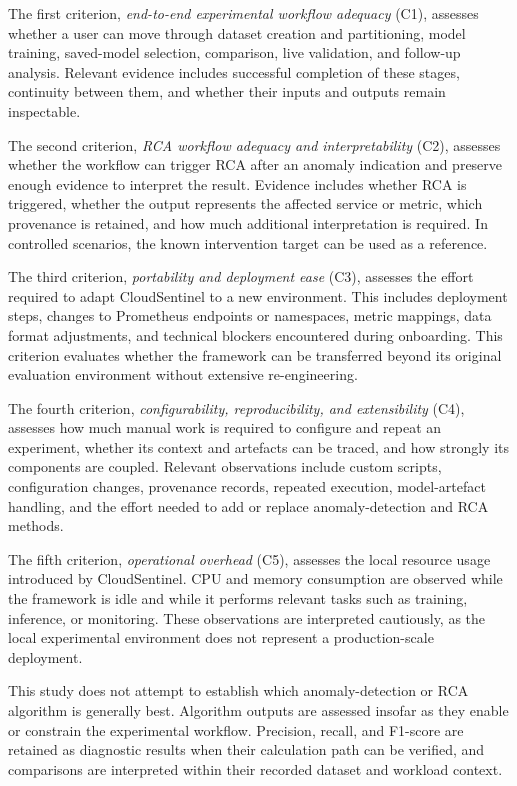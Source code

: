The first criterion, \textit{end-to-end experimental workflow adequacy} (C1), assesses whether a user can move through dataset creation and partitioning, model training, saved-model selection, comparison, live validation, and follow-up analysis. Relevant evidence includes successful completion of these stages, continuity between them, and whether their inputs and outputs remain inspectable.

The second criterion, \textit{RCA workflow adequacy and interpretability} (C2), assesses whether the workflow can trigger RCA after an anomaly indication and preserve enough evidence to interpret the result. Evidence includes whether RCA is triggered, whether the output represents the affected service or metric, which provenance is retained, and how much additional interpretation is required. In controlled scenarios, the known intervention target can be used as a reference.

The third criterion, \textit{portability and deployment ease} (C3), assesses the effort required to adapt CloudSentinel to a new environment. This includes deployment steps, changes to Prometheus endpoints or namespaces, metric mappings, data format adjustments, and technical blockers encountered during onboarding. This criterion evaluates whether the framework can be transferred beyond its original evaluation environment without extensive re-engineering.

The fourth criterion, \textit{configurability, reproducibility, and extensibility} (C4), assesses how much manual work is required to configure and repeat an experiment, whether its context and artefacts can be traced, and how strongly its components are coupled. Relevant observations include custom scripts, configuration changes, provenance records, repeated execution, model-artefact handling, and the effort needed to add or replace anomaly-detection and RCA methods.

The fifth criterion, \textit{operational overhead} (C5), assesses the local resource usage introduced by CloudSentinel. CPU and memory consumption are observed while the framework is idle and while it performs relevant tasks such as training, inference, or monitoring. These observations are interpreted cautiously, as the local experimental environment does not represent a production-scale deployment.

This study does not attempt to establish which anomaly-detection or RCA algorithm is generally best. Algorithm outputs are assessed insofar as they enable or constrain the experimental workflow. Precision, recall, and F1-score are retained as diagnostic results when their calculation path can be verified, and comparisons are interpreted within their recorded dataset and workload context.

